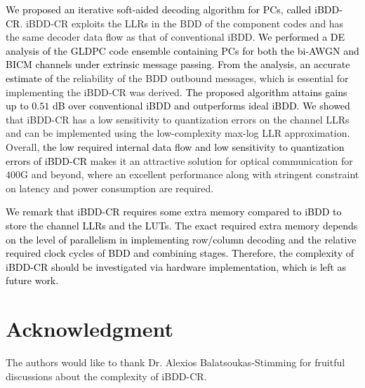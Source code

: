 \documentclass[journal]{IEEEtran}
\newcommand{\SHm}{\textcolor{black}}
\newcommand{\GL}{\textcolor{black}}
\newcommand{\AG}{\textcolor{black}}
\newcommand{\AGc}{\textcolor{black}}
\begin{document}
\AG{We proposed an iterative soft-aided decoding algorithm for PCs, called iBDD-CR}. iBDD-CR exploits the LLRs in the BDD of the component codes and has the same decoder data flow as that of conventional iBDD. \AG{We performed a  DE analysis of  the GLDPC code ensemble containing PCs for both the bi-AWGN and BICM channels under extrinsic message passing}. \AG{From the analysis}, \GL{an accurate estimate of} the reliability of the BDD outbound messages, which is essential for implementing the iBDD-CR was derived. \AG{The proposed algorithm attains gains up to $0.51$ dB over conventional iBDD and outperforms ideal iBDD. We showed} that iBDD-CR has a low sensitivity to quantization errors on the channel LLRs and can be implemented using the low-complexity max-log LLR approximation. Overall, \AG{the low required internal data flow  and  low sensitivity to quantization errors of iBDD-CR} 
makes it an attractive solution for optical communication for $400$G and beyond, where an excellent performance along with stringent constraint on latency and power consumption are required. 

\SHm{
We remark that iBDD-CR requires some extra memory compared to iBDD to store the channel LLRs and the LUTs. The  exact required extra memory  depends on the level of parallelism in implementing row/column decoding and the relative required clock cycles of BDD and combining stages. Therefore, the complexity of iBDD-CR should be investigated via hardware implementation, which is left as future work.}

\section*{Acknowledgment}

The authors would like to thank Dr. Alexios Balatsoukas-Stimming for fruitful discussions about the complexity of iBDD-CR.

\appendices
\end{document}
